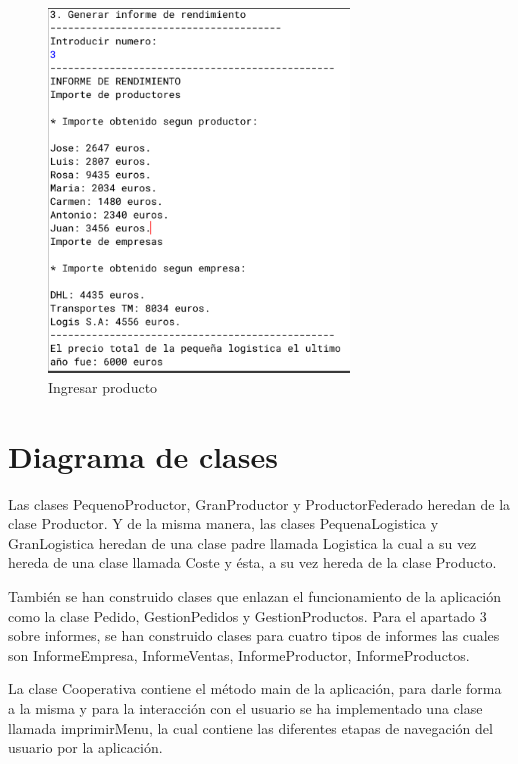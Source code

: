 \documentclass[10pt,a4paper]{article}
\begin{document}
\begin{figure}[H]
  \centerline{
  \includegraphics[width=8cm]{informeRendimiento.png}
  }
  \captionsetup{justification=centering}
  \caption{Ingresar producto \label{fig:opcion1MP} }
\end{figure}




\section{Diagrama de clases}

Las clases PequenoProductor, GranProductor y ProductorFederado heredan de la clase Productor. Y de la misma manera, las clases PequenaLogistica y GranLogistica heredan de una clase padre llamada Logistica la cual a su vez hereda de una clase llamada Coste y ésta, a su vez hereda de la clase Producto.

También se han construido clases que enlazan el funcionamiento de la aplicación como la clase Pedido,  GestionPedidos y GestionProductos. Para el apartado 3 sobre informes, se han construido clases para cuatro tipos de informes las cuales son InformeEmpresa, InformeVentas, InformeProductor, InformeProductos.

La clase Cooperativa contiene el método main de la aplicación, para darle forma a la misma y para la interacción con el usuario se ha implementado una clase llamada imprimirMenu, la cual contiene las diferentes etapas de navegación del usuario por la aplicación.
\end{document}
